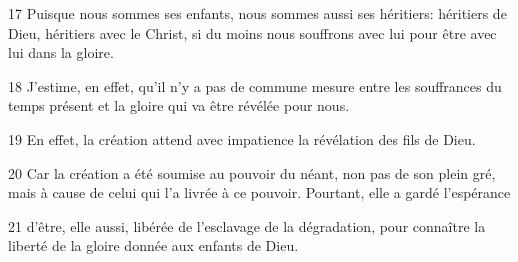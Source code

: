 
17 Puisque nous sommes ses enfants, nous sommes aussi ses héritiers: héritiers de Dieu, héritiers avec le Christ, si du moins nous souffrons avec lui pour être avec lui dans la gloire.

18 J’estime, en effet, qu’il n’y a pas de commune mesure entre les souffrances du temps présent et la gloire qui va être révélée pour nous.

19 En effet, la création attend avec impatience la révélation des fils de Dieu.

20 Car la création a été soumise au pouvoir du néant, non pas de son plein gré, mais à cause de celui qui l’a livrée à ce pouvoir. Pourtant, elle a gardé l’espérance

21 d’être, elle aussi, libérée de l’esclavage de la dégradation, pour connaître la liberté de la gloire donnée aux enfants de Dieu.
